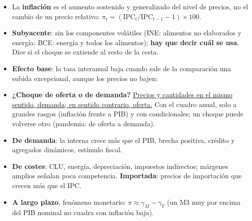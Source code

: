 \documentclass{article}
\begin{document}
\begin{columnas}
\begin{itemize}[itemsep=1.5pt]
\item La \textbf{inflación} es el aumento sostenido y generalizado del nivel de precios, no el cambio de un precio relativo: $\pi_t=(\mathrm{IPC}_t/\mathrm{IPC}_{t-1}-1)\times100$.
\end{itemize}
\begin{itemize}[itemsep=1.5pt]
\item \textbf{Subyacente}: sin los componentes volátiles (INE: alimentos no elaborados y energía; BCE: energía y todos los alimentos); \textbf{hay que decir cuál se usa}. Dice si el choque se extiende al resto de la cesta.
\item \textbf{Efecto base}: la tasa interanual baja cuando sale de la comparación una subida excepcional, aunque los precios no bajen:
\end{itemize}
\begin{itemize}[itemsep=1.5pt]
\item \textbf{¿Choque de oferta o de demanda?} \uline{Precios y cantidades en el mismo sentido, demanda; en sentido contrario, oferta.} Con el cuadro anual, solo a grandes rasgos (inflación frente a PIB) y con condicionales; un choque puede volverse otro (pandemia: de oferta a demanda).
\end{itemize}
\begin{itemize}[itemsep=1.5pt]
\item \textbf{De demanda}: la interna crece más que el PIB, brecha positiva, crédito y agregados dinámicos, estímulo fiscal.
\item \textbf{De costes}: CLU, energía, depreciación, impuestos indirectos; márgenes amplios señalan poca competencia. \textbf{Importada}: precios de importación que crecen más que el IPC.
\item \textbf{A largo plazo}, fenómeno monetario: $\pi\approx\gamma_M-\gamma_Y$ (un M3 muy por encima del PIB nominal no cuadra con inflación baja).

\end{itemize}
\end{columnas}
\end{document}
